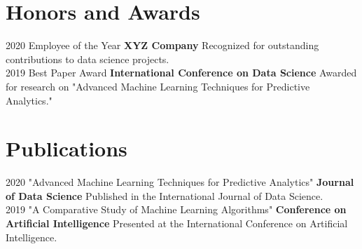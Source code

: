 \documentclass[letterpaper]{CV_class_file} %
\begin{document}
\section{Honors and Awards}

\begin{twenty}
    \twentyitem
        {2020}
        {}
        {\hspace{0.3cm}Employee of the Year}
        {\textbf{XYZ Company}}
        {}
        {Recognized for outstanding contributions to data science projects.}
    \\
    \twentyitem
        {2019}
        {}
        {\hspace{0.3cm}Best Paper Award}
        {\textbf{International Conference on Data Science}}
        {}
        {Awarded for research on "Advanced Machine Learning Techniques for Predictive Analytics."}
\end{twenty}

\makeseconda %

\section{Publications}

\begin{twenty}
    \twentyitem
        {2020}
        {}
        {\hspace{0.3cm}"Advanced Machine Learning Techniques for Predictive Analytics"}
        {\textbf{Journal of Data Science}}
        {}
        {Published in the International Journal of Data Science.}
    \\
    \twentyitem
        {2019}
        {}
        {\hspace{0.3cm}"A Comparative Study of Machine Learning Algorithms"}
        {\textbf{Conference on Artificial Intelligence}}
        {}
        {Presented at the International Conference on Artificial Intelligence.}
\end{twenty}

\end{document}

